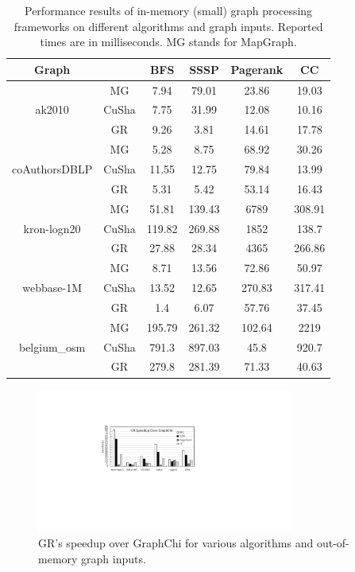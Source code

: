 \begin{table}[h]%
\centering
\begin{tabular}{|c|c|c|c|c|c|}
\hline
Graph &  & BFS & SSSP & Pagerank & CC \\ \hline
\multirow{3}{*}{ak2010} & MG & 7.94 & 79.01 & 23.86 & 19.03 \\ \cline{2-6} 
 & CuSha & 7.75 & 31.99 & 12.08 & 10.16 \\ \cline{2-6} 
 & GR & 9.26 & 3.81 & 14.61 & 17.78 \\ \hline
\multirow{3}{*}{coAuthorsDBLP} & MG & 5.28 & 8.75 & 68.92 & 30.26 \\ \cline{2-6} 
 & CuSha & 11.55 & 12.75 & 79.84 & 13.99 \\ \cline{2-6} 
 & GR & 5.31 & 5.42 & 53.14 & 16.43 \\ \hline
\multirow{3}{*}{kron-logn20} & MG & 51.81 & 139.43 & 6789 & 308.91 \\ \cline{2-6} 
 & CuSha & 119.82 & 269.88 & 1852 & 138.7 \\ \cline{2-6} 
 & GR & 27.88 & 28.34 & 4365 & 266.86 \\ \hline
\multirow{3}{*}{webbase-1M} & MG & 8.71 & 13.56 & 72.86 & 50.97 \\ \cline{2-6} 
 & CuSha & 13.52 & 12.65 & 270.83 & 317.41 \\ \cline{2-6} 
 & GR & 1.4 & 6.07 & 57.76 & 37.45 \\ \hline
\multirow{3}{*}{belgium\_osm} & MG & 195.79 & 261.32 & 102.64 & 2219 \\ \cline{2-6} 
 & CuSha & 791.3 & 897.03 & 45.8 & 920.7 \\ \cline{2-6} 
 & GR & 279.8 & 281.39 & 71.33 & 40.63 \\ \hline
\end{tabular}
\caption{Performance results of in-memory (small) graph processing frameworks on different algorithms and graph inputs. Reported times are in { milliseconds}. {MG stands for MapGraph.}}
\label{smalldata}
\end{table}


\begin{figure}[!t]
\centering
\includegraphics[width=0.75\textwidth,height=0.75\textheight,keepaspectratio]{figures/speedup1.pdf}
\caption{GR's speedup over GraphChi for various algorithms and out-of-memory graph inputs. }
\label{fig:speedup1}
\end{figure}

